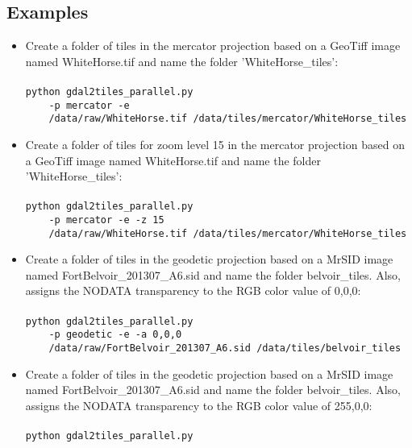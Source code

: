 \documentclass{article}
\begin{document}
\subsection{Examples}
\begin{itemize}
    \item
        Create a folder of tiles in the mercator projection based on a GeoTiff
        image named WhiteHorse.tif and name the folder 'WhiteHorse\_tiles':\\
        \\
        \lstinline|python gdal2tiles_parallel.py|\\
        \lstinline|    -p mercator -e|\\
        \lstinline|    /data/raw/WhiteHorse.tif /data/tiles/mercator/WhiteHorse_tiles|\\
    \item
        Create a folder of tiles for zoom level 15 in the mercator projection
        based on a GeoTiff image named WhiteHorse.tif and name the folder
        'WhiteHorse\_tiles':\\
        \\
        \lstinline|python gdal2tiles_parallel.py|\\
        \lstinline|    -p mercator -e -z 15|\\
        \lstinline|    /data/raw/WhiteHorse.tif /data/tiles/mercator/WhiteHorse_tiles|\\
    \item
        Create a folder of tiles in the geodetic projection based on a MrSID
        image named FortBelvoir\_201307\_A6.sid and name the folder
        belvoir\_tiles. Also, assigns the NODATA transparency to the RGB color
        value of 0,0,0:\\
        \\
        \lstinline|python gdal2tiles_parallel.py|\\
        \lstinline|    -p geodetic -e -a 0,0,0|\\
        \lstinline|    /data/raw/FortBelvoir_201307_A6.sid /data/tiles/belvoir_tiles|
    \item
        Create a folder of tiles in the geodetic projection based on a MrSID
        image named FortBelvoir\_201307\_A6.sid and name the folder
        belvoir\_tiles. Also, assigns the NODATA transparency to the RGB color
        value of 255,0,0:\\
        \\
        \lstinline|python gdal2tiles_parallel.py|\\

\end{itemize}
\end{document}
